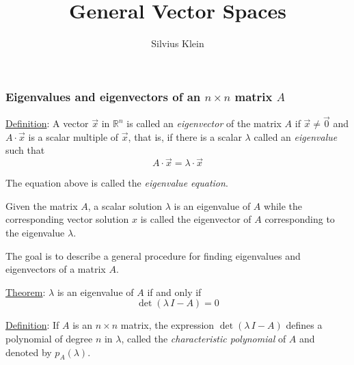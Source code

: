 \documentclass[handout]{beamer}  %
\title{
General Vector Spaces}
\author{Silvius Klein}
\date{}
\institute{MA1202 Linear Algebra with Applications}
\newcommand{\R}{\mathbb{R}}
\begin{document}


\begin{frame}
\frametitle{Eigenvalues and eigenvectors of an $n \times n$ matrix $A$}



\underline{Definition}: A vector $\vec{x}$ in $\R^n$ is called an {\em eigenvector} of the matrix $A$ if $\vec{x} \neq \vec{0}$ and $A \cdot \vec{x}$ is a scalar multiple of $\vec{x}$, that is, if there is a scalar $\lambda$ called an {\em eigenvalue} such that
\begin{equation}\label{ev-eq}
A \cdot \vec{x} = \lambda \cdot \vec{x}
\end{equation}

The equation above is called the {\em eigenvalue equation}. 

Given the matrix $A$, a scalar solution $\lambda$ is an eigenvalue of $A$ while the corresponding vector solution $x$ is called the eigenvector of $A$ corresponding to the eigenvalue $\lambda$.

\medskip

The goal is to describe a general procedure for finding eigenvalues and eigenvectors of a matrix $A$.

\medskip

\underline{Theorem}: $\lambda$ is an eigenvalue of $A$ if and only if 
$$\det (\lambda \, I - A ) = 0$$

\underline{Definition}: If $A$ is an $n \times n$ matrix, the expression $\det (\lambda \, I - A )$ defines a polynomial of degree $n$ in $\lambda$, called the {\em characteristic polynomial} of $A$ and denoted by $p_A (\lambda)$.

\end{frame}
\end{document}
